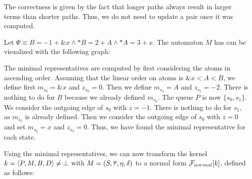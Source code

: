 The correctness is given by the fact that longer paths always result in larger terms than shorter paths.
Thus, we do not need to update a pair once it was computed.

\begin{example}\label{ex:min-repr}
    Let $\Psi \equiv B = -1 + \&x \land *B = 2 + A \land *A = 3 + x$.
    The automaton $M$ has can be visualized with the following graph:
    \begin{center}
    \end{center}

    The minimal representatives are computed by first considering the atoms in ascending order.
    Assuming that the linear order on atoms is $\&x < A < B$,
    we define first $m_{s_0} = \&x$ and $z_{s_0} = 0$.
    Then we define $m_{s_1} = A$ and $z_{s_1} = -2$.
    There is nothing to do for $B$ because we already defined $m_{s_0}$.
    The queue $P$ is now $\{s_0, s_1\}$.
    We consider the outgoing edge of $s_0$ with $z = -1$.
    There is nothing to do for $s_1$, as $m_{s_1}$ is already defined.
    Then we consider the outgoing edge of $s_0$ with $z = 0$
    and set $m_{s_2} = x$ and $z_{s_2} = 0$.
    Thus, we have found the minimal representative for each state.
\end{example}
Using the minimal representatives, we can now transform the kernel $k = \langle P,M,B,D\rangle \neq \bot$ with $M = (S, \overline{\tau}, \eta, \delta)$ to a normal form $\mathcal{F}_{normal}[k]$,
defined as follows:

